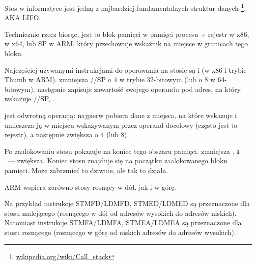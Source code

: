 \mysection{\Stack}
\label{sec:stack}
\myindex{\Stack}

Stos w informatyce jest jedną z najbardziej fundamentalnych struktur danych
\footnote{\href{http://en.wikipedia.org/wiki/Call_stack}{wikipedia.org/wiki/Call\_stack}}.
\ac{AKA} \ac{LIFO}.

Technicznie rzecz biorąc, jest to blok pamięci w pamięci procesu + rejestr \ESP w x86, \RSP w x64, lub \ac{SP} w ARM, który przechowuje wskaźnik na miejsce w granicach tego bloku.

Najczęściej używanymi instrukcjami do operowania na stosie są \PUSH i \POP (w x86 i trybie Thumb w ARM).
\PUSH zmniejsza \ESP/\RSP/\ac{SP} o 4 w trybie 32-bitowym (lub o 8 w 64-bitowym),
następnie zapisuje zawartość swojego operandu pod adres, na który wskazuje \ESP/\RSP/\ac{SP}, .

\POP jest odwrotną operacją: najpierw pobiera dane z miejsca, na które wskazuje  i umieszcza ją w miejscu wskazywanym przez operand docelowy
(często jest to rejestr), a następnie zwiększa  o 4 (lub 8).

Po zaalokowaniu stosu  pokazuje na koniec tego obszaru pamięci.
\PUSH zmniejsza , а \POP~--- zwiększa.
Koniec stosu znajduje się na początku zaalokowanego bloku pamięci. Może zabrzmieć to dziwnie, ale tak to działa.

ARM wspiera zarówno stosy rosnący w dół, jak i w górę.


Na przykład instrukcje \ac{STMFD}/\ac{LDMFD}, \ac{STMED}/\ac{LDMED} są przeznaczone dla stosu malejącego (rosnącego w dół od adresów wysokich do adresów niskich).\\
Natomiast instrukcje \ac{STMFA}/\ac{LDMFA}, \ac{STMEA}/\ac{LDMEA} są przeznaczone dla stosu rosnącego (rosnącego w górę od niskich adresów do adresów wysokich).


